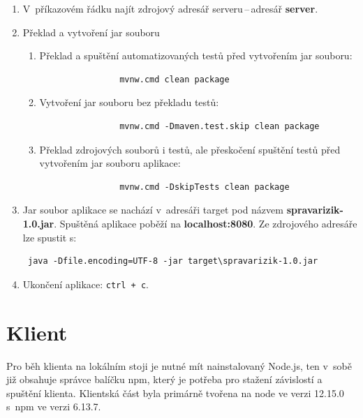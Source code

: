 \begin{enumerate}
    \item V~příkazovém řádku najít zdrojový adresář serveru\,--\,adresář \textbf{server}.
    \item Překlad a vytvoření jar souboru
        \begin{enumerate}
            \item Překlad a spuštění automatizovaných testů před vytvořením jar souboru:
            \begin{verbatim}
                mvnw.cmd clean package
            \end{verbatim}
            \item Vytvoření jar souboru bez překladu testů:
            \begin{verbatim}
                mvnw.cmd -Dmaven.test.skip clean package
            \end{verbatim}
            \item Překlad zdrojových souborů i testů, ale přeskočení spuštění testů před vytvořením jar souboru aplikace:
            \begin{verbatim}
                mvnw.cmd -DskipTests clean package
            \end{verbatim}
        \end{enumerate}
    \item Jar soubor aplikace se nachází v~adresáři target pod názvem \textbf{spravarizik-1.0.jar}. Spuštěná aplikace poběží na \textbf{localhost:8080}. Ze zdrojového adresáře lze spustit s: 
    \begin{verbatim} java -Dfile.encoding=UTF-8 -jar target\spravarizik-1.0.jar \end{verbatim}
    \item Ukončení aplikace: \texttt{ctrl + c}.
    
\end{enumerate}

\section{Klient}

Pro běh klienta na lokálním stoji je nutné mít nainstalovaný Node.js, ten v~sobě již obsahuje správce balíčku npm, který je potřeba pro stažení závislostí a spuštění klienta. Klientská část byla primárně tvořena na node ve verzi 12.15.0 s~npm ve verzi 6.13.7.

